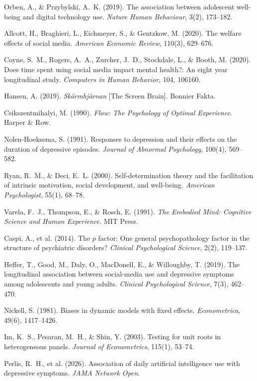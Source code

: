 \documentclass[a4paper,11pt,titlepage]{article}
\begin{document}
\begin{enumerate}[label={[\arabic*]}, leftmargin=2em, itemsep=2pt]
  \item Orben, A., \& Przybylski, A.~K. (2019). The association between adolescent well-being and digital technology use. \textit{Nature Human Behaviour}, 3(2), 173--182.
  \item Allcott, H., Braghieri, L., Eichmeyer, S., \& Gentzkow, M. (2020). The welfare effects of social media. \textit{American Economic Review}, 110(3), 629--676.
  \item Coyne, S.~M., Rogers, A.~A., Zurcher, J.~D., Stockdale, L., \& Booth, M. (2020). Does time spent using social media impact mental health?: An eight year longitudinal study. \textit{Computers in Human Behavior}, 104, 106160.
  \item Hansen, A. (2019). \textit{Sk\"armhj\"arnan} [The Screen Brain]. Bonnier Fakta.
  \item Csikszentmihalyi, M. (1990). \textit{Flow: The Psychology of Optimal Experience}. Harper \& Row.
  \item Nolen-Hoeksema, S. (1991). Responses to depression and their effects on the duration of depressive episodes. \textit{Journal of Abnormal Psychology}, 100(4), 569--582.
  \item Ryan, R.~M., \& Deci, E.~L. (2000). Self-determination theory and the facilitation of intrinsic motivation, social development, and well-being. \textit{American Psychologist}, 55(1), 68--78.
  \item Varela, F.~J., Thompson, E., \& Rosch, E. (1991). \textit{The Embodied Mind: Cognitive Science and Human Experience}. MIT Press.
  \item Caspi, A., et al. (2014). The $p$ factor: One general psychopathology factor in the structure of psychiatric disorders? \textit{Clinical Psychological Science}, 2(2), 119--137.
  \item Heffer, T., Good, M., Daly, O., MacDonell, E., \& Willoughby, T. (2019). The longitudinal association between social-media use and depressive symptoms among adolescents and young adults. \textit{Clinical Psychological Science}, 7(3), 462--470.
  \item Nickell, S. (1981). Biases in dynamic models with fixed effects. \textit{Econometrica}, 49(6), 1417--1426.
  \item Im, K.~S., Pesaran, M.~H., \& Shin, Y. (2003). Testing for unit roots in heterogeneous panels. \textit{Journal of Econometrics}, 115(1), 53--74.
  \item Perlis, R.~H., et al. (2026). Association of daily artificial intelligence use with depressive symptoms. \textit{JAMA Network Open}.

\end{enumerate}
\end{document}
